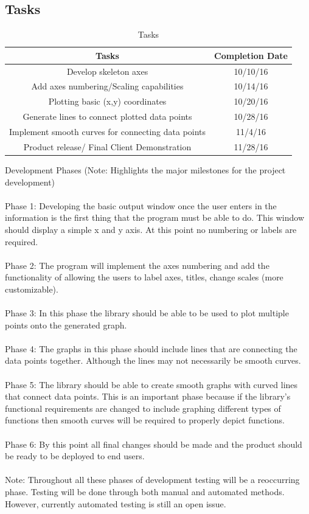 \documentclass[12pt, titlepage]{article}
\begin{document}
\subsection{Tasks} 
\begin{center}
\begin{table}[!hpb]
    \caption{Tasks} 
    \begin{tabular}{|c|c|}
	\hline
	Tasks & Completion Date \\ \hline
	Develop skeleton axes  & 10/10/16 \\ \hline
	Add axes numbering/Scaling capabilities & 10/14/16 \\ \hline
	Plotting basic (x,y) coordinates & 10/20/16 \\ \hline
	Generate lines to connect plotted data points & 10/28/16 \\ \hline
	Implement smooth curves for connecting data points & 11/4/16 \\ \hline
	Product release/ Final Client Demonstration  & 11/28/16 \\ \hline
    \end{tabular}
\end{table}
\end{center}
Development Phases (Note: Highlights the major milestones for the project development)\\ \\
Phase 1: Developing the basic output window once the user enters in the information is the first thing that the program must be able to do. This window should display a simple x and y axis. At this point no numbering or labels are required. \\ \\
Phase 2: The program will implement the axes numbering and add the functionality of allowing the users to label axes, titles, change scales (more customizable).\\ \\
Phase 3: In this phase the library should be able to be used to plot multiple points onto the generated graph.\\ \\
Phase 4: The graphs in this phase should include lines that are connecting the data points together. Although the lines may not necessarily be smooth curves.\\ \\
Phase 5: The library should be able to create smooth graphs with curved lines that connect data points. This is an important phase because if the library's functional requirements are changed to include graphing different types of functions then smooth curves will be required to properly depict functions.\\ \\
Phase 6: By this point all final changes should be made and the product should be ready to be deployed to end users.\\ \\
Note: Throughout all these phases of development testing will be a reoccurring phase. Testing will be done through both manual and automated methods. However, currently automated testing is still an open issue. \\ \\
\end{document}
